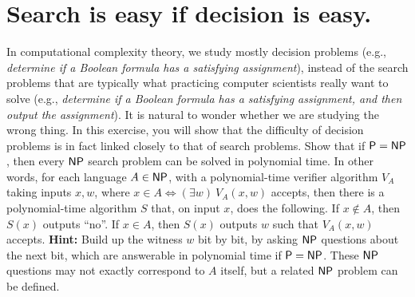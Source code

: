 

\maketitle
\thispagestyle{firststyle}
\vspace{-2.0cm}

\section*{Search is easy if decision is easy.}
    In computational complexity theory, we study mostly decision problems
    (e.g., \emph{determine if a Boolean formula has a satisfying assignment}),
    instead of the search problems that are typically what practicing computer scientists really want to solve
    (e.g., \emph{determine if a Boolean formula has a satisfying assignment, and then output the assignment}).
    It is natural to wonder whether we are studying the wrong thing.
    In this exercise, you will show that the difficulty of decision problems is in fact linked closely to that of search problems.
        Show that if $\mathsf{P} = \mathsf{NP}$, then every $\mathsf{NP}$ search problem can be solved in polynomial time.
    In other words, for each language $A \in \mathsf{NP}$, with a polynomial-time verifier algorithm $V_A$ taking inputs $x,w$, where $x \in A \iff (\exists w)\ V_A(x,w)$ accepts, then there is a polynomial-time algorithm $S$ that, on input $x$, does the following.
    If $x \not\in A$, then $S(x)$ outputs ``no''.
    If $x \in A$, then $S(x)$ outputs $w$ such that $V_A(x,w)$ accepts.
        {\bf Hint:}
    Build up the witness $w$ bit by bit, by asking $\mathsf{NP}$ questions about the next bit, which are answerable in polynomial time if $\mathsf{P} = \mathsf{NP}$.
    These $\mathsf{NP}$ questions may not exactly correspond to $A$ itself, but a related $\mathsf{NP}$ problem can be defined.

